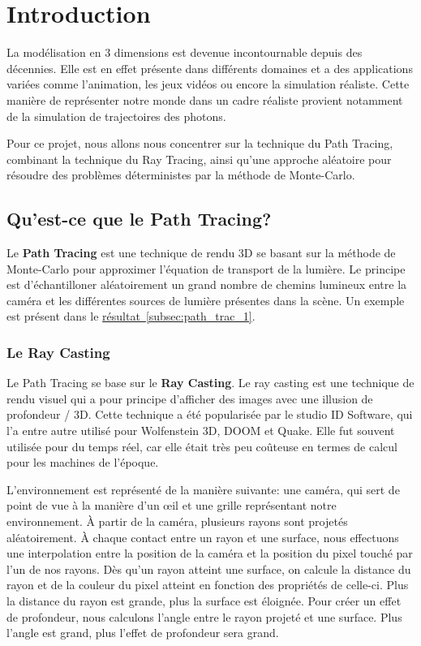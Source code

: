 \section{Introduction}

La modélisation en 3 dimensions est devenue incontournable depuis des décennies. Elle est en effet présente dans différents domaines et a des applications variées comme l'animation, les jeux vidéos ou encore la simulation réaliste. Cette manière de représenter notre monde dans un cadre réaliste provient notamment de la simulation de trajectoires des photons.

Pour ce projet, nous allons nous concentrer sur la technique du Path Tracing, combinant la technique du Ray Tracing, ainsi qu'une approche aléatoire pour résoudre des problèmes déterministes par la méthode de Monte-Carlo.

\subsection{Qu'est-ce que le Path Tracing?}

Le \textbf{Path Tracing} est une technique de rendu 3D se basant sur la méthode de Monte-Carlo pour approximer l'équation de transport de la lumière. Le principe est d'échantilloner aléatoirement un grand nombre de chemins lumineux entre la caméra et les différentes sources de lumière présentes dans la scène. Un exemple est présent dans le \hyperref[subsec:path_trac_1]{résultat~\ref*{subsec:path_trac_1}}.

\subsubsection{Le Ray Casting}

Le Path Tracing se base sur le \textbf{Ray Casting}. Le ray casting est une technique de rendu visuel qui a pour principe d'afficher des images avec une illusion de profondeur / 3D. Cette technique a été popularisée par le studio ID Software, qui l'a entre autre utilisé pour Wolfenstein 3D, DOOM et Quake. Elle fut souvent utilisée pour du temps réel, car elle était très peu coûteuse en termes de calcul pour les machines de l'époque.

L'environnement est représenté de la manière suivante: une caméra, qui sert de point de vue à la manière d'un \oe il et une grille représentant notre environnement. À partir de la caméra, plusieurs rayons sont projetés aléatoirement. À chaque contact entre un rayon et une surface, nous effectuons une interpolation entre la position de la caméra et la position du pixel touché par l'un de nos rayons. Dès qu'un rayon atteint une surface, on calcule la distance du rayon et de la couleur du pixel atteint en fonction des propriétés de celle-ci. Plus la distance du rayon est grande, plus la surface est éloignée. Pour créer un effet de profondeur, nous calculons l'angle entre le rayon projeté et une surface. Plus l'angle est grand, plus l'effet de profondeur sera grand.

